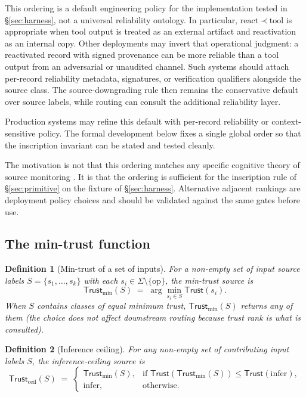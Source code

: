 \documentclass[11pt]{article}
\newtheorem{definition}{Definition}
\newcommand{\Trust}{\mathsf{Trust}}
\newcommand{\SourceSet}{\Sigma}
\newcommand{\tool}{\ensuremath{\mathrm{tool}}}
\newcommand{\react}{\ensuremath{\mathrm{react}}}
\newcommand{\infer}{\ensuremath{\mathrm{infer}}}
\newcommand{\op}{\ensuremath{\mathrm{op}}}
\begin{document}
This ordering is a default engineering policy for the implementation tested in \S\ref{sec:harness}, not a universal reliability ontology. In particular, $\react \prec \tool$ is appropriate when tool output is treated as an external artifact and reactivation as an internal copy. Other deployments may invert that operational judgment: a reactivated record with signed provenance can be more reliable than a tool output from an adversarial or unaudited channel. Such systems should attach per-record reliability metadata, signatures, or verification qualifiers alongside the source class. The source-downgrading rule then remains the conservative default over source labels, while routing can consult the additional reliability layer.

Production systems may refine this default with per-record reliability or context-sensitive policy. The formal development below fixes a single global order so that the inscription invariant can be stated and tested cleanly.

The motivation is not that this ordering matches any specific cognitive theory of source monitoring \cite{JohnsonHashtroudiLindsay1993,JohnsonRaye1981Reality}. It is that the ordering is sufficient for the inscription rule of \S\ref{sec:primitive} on the fixture of \S\ref{sec:harness}. Alternative adjacent rankings are deployment policy choices and should be validated against the same gates before use.

\subsection{The min-trust function}

\begin{definition}[Min-trust of a set of inputs]
\label{def:mintrust}
For a non-empty set of input source labels $S = \{s_1, \ldots, s_k\}$ with each $s_i \in \SourceSet \setminus \{\op\}$, the min-trust source is
\[
\Trust_{\min}(S) \;=\; \arg\min_{s_i \in S} \Trust(s_i).
\]
When $S$ contains classes of equal minimum trust, $\Trust_{\min}(S)$ returns any of them (the choice does not affect downstream routing because trust rank is what is consulted).
\end{definition}

\begin{definition}[Inference ceiling]
\label{def:ceiling}
For any non-empty set of contributing input labels $S$, the inference-ceiling source is
\[
\Trust_{\text{ceil}}(S) \;=\; \begin{cases}
\Trust_{\min}(S), & \text{if } \Trust(\Trust_{\min}(S)) \leq \Trust(\infer), \\
\infer, & \text{otherwise.}
\end{cases}
\]
\end{definition}
\end{document}
